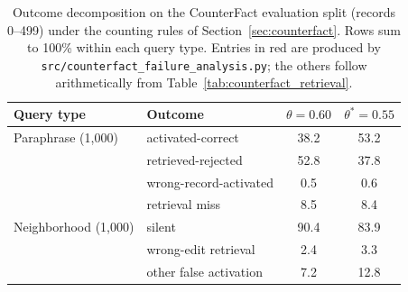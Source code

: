 \documentclass[preprint,12pt]{elsarticle}
\newif\ifmarkchanges
\newcommand{\rev}[1]{\ifmarkchanges{\color{blue}#1}\else#1\fi}
\begin{document}
\begin{table}[t]
\centering
\caption{\rev{Outcome decomposition on the CounterFact evaluation split (records 0--499) under the counting rules of Section~\ref{sec:counterfact}. Rows sum to 100\% within each query type. Entries in red are produced by \texttt{src/counterfact\_failure\_analysis.py}; the others follow arithmetically from Table~\ref{tab:counterfact_retrieval}.}}
\label{tab:counterfact_buckets}
\vspace{0.5em}
\footnotesize
\begin{tabular}{@{}llcc@{}}
\toprule
Query type & Outcome & $\theta=0.60$ & $\theta^*=0.55$ \\
\midrule
Paraphrase (1,000) & activated-correct & 38.2 & 53.2 \\
 & retrieved-rejected & 52.8 & 37.8 \\
 & wrong-record-activated & 0.5 & 0.6 \\
 & retrieval miss & 8.5 & 8.4 \\
\midrule
Neighborhood (1,000) & silent & 90.4 & 83.9 \\
 & wrong-edit retrieval & 2.4 & 3.3 \\
 & other false activation & 7.2 & 12.8 \\
\bottomrule
\end{tabular}
\end{table}
\end{document}
